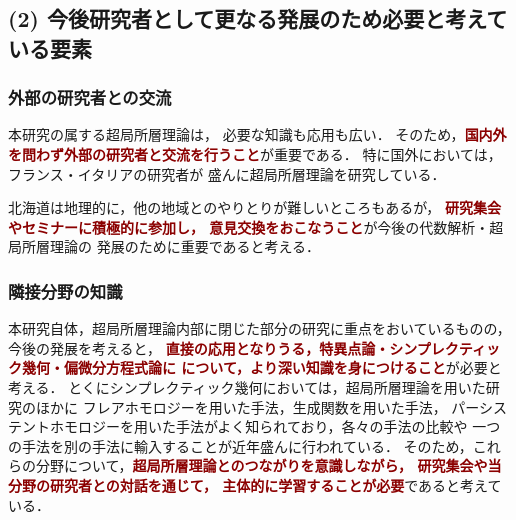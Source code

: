 \documentclass[10pt,a4paper,uplatex,dvipdfmx]{ujarticle} 		%
\newcommand{\研究課題名}{打切り超局所台の関手的性質の研究とMorse理論への応用}
\newcommand{\研究機関名}{北海道大学}
\newcommand{\研究代表者氏名}{大柴寿浩}
\begin{document}
\subsection*{(2) 今後研究者として更なる発展のため必要と考えている要素}
\subsubsection*{外部の研究者との交流}
本研究の属する超局所層理論は，
必要な知識も応用も広い．
そのため，\textcolor{darkred}{\textbf{国内外を問わず外部の研究者と交流を行うこと}}が重要である．
特に国外においては，フランス・イタリアの研究者が
盛んに超局所層理論を研究している．

北海道は地理的に，他の地域とのやりとりが難しいところもあるが，
\textcolor{darkred}{\textbf{研究集会やセミナーに積極的に参加し，
意見交換をおこなうこと}}が今後の代数解析・超局所層理論の
発展のために重要であると考える．

\subsubsection*{隣接分野の知識}
本研究自体，超局所層理論内部に閉じた部分の研究に重点をおいているものの，
今後の発展を考えると，
\textcolor{darkred}{\textbf{直接の応用となりうる，特異点論・シンプレクティック幾何・偏微分方程式論に
について，より深い知識を身につけること}}が必要と考える．
とくにシンプレクティック幾何においては，超局所層理論を用いた研究のほかに
フレアホモロジーを用いた手法，生成関数を用いた手法，
パーシステントホモロジーを用いた手法がよく知られており，各々の手法の比較や
一つの手法を別の手法に輸入することが近年盛んに行われている．
そのため，これらの分野について，\textcolor{darkred}{\textbf{超局所層理論とのつながりを意識しながら，
研究集会や当分野の研究者との対話を通じて，
主体的に学習することが必要}}であると考えている．




\end{document}
